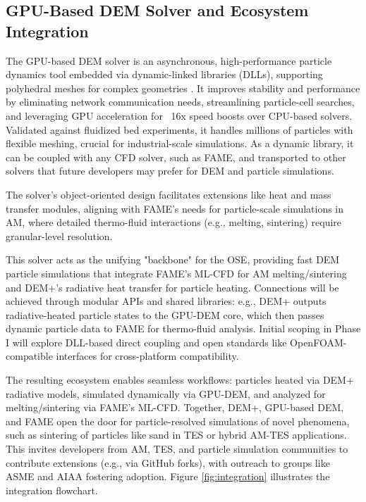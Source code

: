 \documentclass[11pt]{article}
\begin{document}
\subsection*{GPU-Based DEM Solver and Ecosystem Integration}
\noindent
The GPU-based DEM solver is an asynchronous, high-performance particle dynamics tool embedded via dynamic-linked libraries (DLLs), supporting polyhedral meshes for complex geometries \cite{kianimoqadamAsynchronousGPUbasedSolver2024}. It improves stability and performance by eliminating network communication needs, streamlining particle-cell searches, and leveraging GPU acceleration for ~16x speed boosts over CPU-based solvers. Validated against fluidized bed experiments, it handles millions of particles with flexible meshing, crucial for industrial-scale simulations. As a dynamic library, it can be coupled with any CFD solver, such as FAME, and transported to other solvers that future developers may prefer for DEM and particle simulations.

The solver's object-oriented design facilitates extensions like heat and mass transfer modules, aligning with FAME's needs for particle-scale simulations in AM, where detailed thermo-fluid interactions (e.g., melting, sintering) require granular-level resolution.

This solver acts as the unifying "backbone" for the OSE, providing fast DEM particle simulations that integrate FAME's ML-CFD for AM melting/sintering and DEM+'s radiative heat transfer for particle heating. Connections will be achieved through modular APIs and shared libraries: e.g., DEM+ outputs radiative-heated particle states to the GPU-DEM core, which then passes dynamic particle data to FAME for thermo-fluid analysis. Initial scoping in Phase I will explore DLL-based direct coupling and open standards like OpenFOAM-compatible interfaces for cross-platform compatibility.

The resulting ecosystem enables seamless workflows: particles heated via DEM+ radiative models, simulated dynamically via GPU-DEM, and analyzed for melting/sintering via FAME's ML-CFD. Together, DEM+, GPU-based DEM, and FAME open the door for particle-resolved simulations of novel phenomena, such as sintering of particles like sand in TES or hybrid AM-TES applications. This invites developers from AM, TES, and particle simulation communities to contribute extensions (e.g., via GitHub forks), with outreach to groups like ASME and AIAA fostering adoption. Figure \ref{fig:integration} illustrates the integration flowchart.
\end{document}
